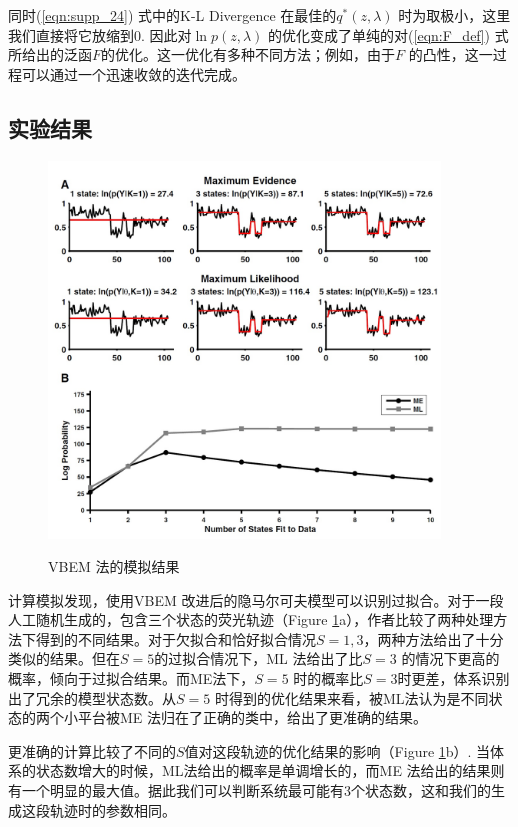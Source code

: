 \documentclass[11pt, a4paper]{article}
\begin{document}
    同时(\ref{eqn:supp_24}) 式中的K-L Divergence 在最佳的$q^*(z,\lambda)$ 时为取极小，这里我们直接将它放缩到0. 因此对$\ln p(z,\lambda)$ 的优化变成了单纯的对(\ref{eqn:F_def}) 式所给出的泛函$F$的优化。这一优化有多种不同方法；例如，由于$F$ 的凸性，这一过程可以通过一个迅速收敛的迭代完成。

    \subsection{实验结果}
    \begin{figure}[htb]
      \centering
      \includegraphics[height=10cm]{fig_vbms.jpg}\\
      \caption{VBEM 法的模拟结果}
      \label{fig:vbem}
    \end{figure}

    计算模拟发现，使用VBEM 改进后的隐马尔可夫模型可以识别过拟合。对于一段人工随机生成的，包含三个状态的荧光轨迹（Figure \ref{fig:vbem}a），作者比较了两种处理方法下得到的不同结果。对于欠拟合和恰好拟合情况$S=1, 3$，两种方法给出了十分类似的结果。但在$S=5$的过拟合情况下，ML 法给出了比$S=3$ 的情况下更高的概率，倾向于过拟合结果。而ME法下，$S=5$ 时的概率比$S=3$时更差，体系识别出了冗余的模型状态数。从$S=5$ 时得到的优化结果来看，被ML法认为是不同状态的两个小平台被ME 法归在了正确的类中，给出了更准确的结果。

    更准确的计算比较了不同的$S$值对这段轨迹的优化结果的影响（Figure \ref{fig:vbem}b）. 当体系的状态数增大的时候，ML法给出的概率是单调增长的，而ME 法给出的结果则有一个明显的最大值。据此我们可以判断系统最可能有3个状态数，这和我们的生成这段轨迹时的参数相同。
\end{document}
